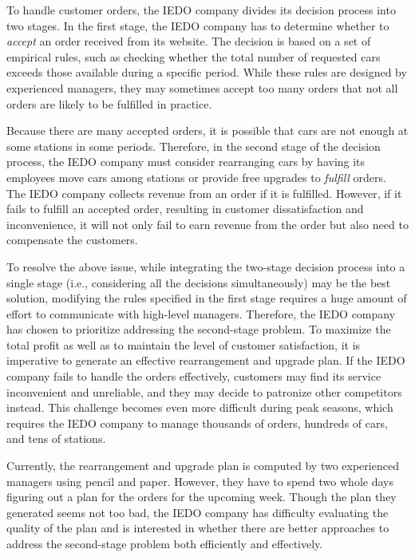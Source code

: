 \documentclass[11pt,a4paper]{article}
\begin{document}
To handle customer orders, the IEDO company divides its decision process into two stages. In the first stage, the IEDO company has to determine whether to \textit{accept} an order received from its website. The decision is based on a set of empirical rules, such as checking whether the total number of requested cars exceeds those available during a specific period. While these rules are designed by experienced managers, they may sometimes accept too many orders that not all orders are likely to be fulfilled in practice. 

Because there are many accepted orders, it is possible that cars are not enough at some stations in some periods. Therefore, in the second stage of the decision process, the IEDO company must consider rearranging cars by having its employees move cars among stations or provide free upgrades to \textit{fulfill} orders. The IEDO company collects revenue from an order if it is fulfilled. However, if it fails to fulfill an accepted order, resulting in customer dissatisfaction and inconvenience, it will not only fail to earn revenue from the order but also need to compensate the customers.

To resolve the above issue, while integrating the two-stage decision process into a single stage (i.e., considering all the decisions simultaneously) may be the best solution, modifying the rules specified in the first stage requires a huge amount of effort to communicate with high-level managers. Therefore, the IEDO company has chosen to prioritize addressing the second-stage problem. To maximize the total profit as well as to maintain the level of customer satisfaction, it is imperative to generate an effective rearrangement and upgrade plan. 
If the IEDO company fails to handle the orders effectively, customers may find its service inconvenient and unreliable, and they may decide to patronize other competitors instead. This challenge becomes even more difficult during peak seasons, which requires the IEDO company to manage thousands of orders, hundreds of cars, and tens of stations. 

Currently, the rearrangement and upgrade plan is computed by two experienced managers using pencil and paper. However, they have to spend two whole days figuring out a plan for the orders for the upcoming week. Though the plan they generated seems not too bad, the IEDO company has difficulty evaluating the quality of the plan and is interested in whether there are better approaches to address the second-stage problem both efficiently and effectively.
\end{document}
